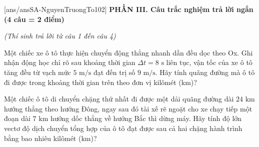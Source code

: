 
[ans/ansSA-NguyenTruongTo102]
\noindent \textbf{PHẦN III. Câu trắc nghiệm trả lời ngắn (4 câu = 2 điểm)}

\noindent \textit{(Thí sinh trả lời từ câu 1 đến câu 4)}
\vspace{0.2cm}

\begin{ex}%
	Một chiếc xe ô tô thực hiện chuyển động thẳng nhanh dần đều dọc theo Ox. Ghi nhận động học chỉ rõ sau khoảng thời gian $\Delta t = 8\text{ s}$ liên tục, vận tốc của xe ô tô tăng đều từ vạch mức $5\text{ m/s}$ đạt đến trị số $9\text{ m/s}$. Hãy tính quãng đường mà ô tô đi được trong khoảng thời gian trên theo đơn vị kilômét (km)?
\end{ex}

\begin{ex}%
	Một chiếc ô tô di chuyển chặng thứ nhất đi được một dải quãng đường dài $24\text{ km}$ hướng thẳng theo hướng Đông, ngay sau đó tài xế rẽ ngoặt cho xe chạy tiếp một đoạn dài $7\text{ km}$ hướng dốc thẳng về hướng Bắc thì dừng máy. Hãy tính độ lớn vectơ độ dịch chuyển tổng hợp của ô tô đạt được sau cả hai chặng hành trình bằng bao nhiêu kilômét (km)?
\end{ex}

